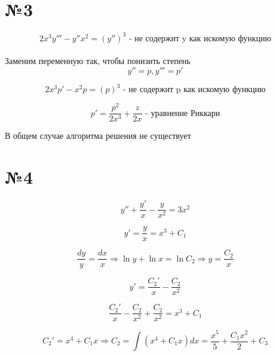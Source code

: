 \documentclass{article}
\begin{document}
\section*{№3}

\begin{equation*}
    2x^3y''' - y''x^2 = (y'')^3 \text{ - не содержит y как искомую функцию}
\end{equation*}
\\Заменим переменную так, чтобы понизить степень\\
\begin{equation*}
    y'' = p, y''' = p'
\end{equation*}

\begin{equation*}
    2x^3p' - x^2p = (p)^3 \text{ - не содержит p как искомую функцию}
\end{equation*}

\begin{equation*}
    p' = \frac{p^2}{2x^3} + \frac{z}{2x} \text{ - уравнение Риккари}
\end{equation*}

В общем случае алгоритма решения не существует

\section*{№4}

\begin{equation*}
    y'' + \frac{y'}{x} - \frac{y}{x^2} = 3x^2
\end{equation*}

\begin{equation*}
    y' = \frac{y}{x} = x^3 + C_1
\end{equation*}

\begin{equation*}
    \frac{dy}{y} = \frac{dx}{x} \Rightarrow \ln{y} + \ln{x} = \ln{C_2} \Rightarrow y = \frac{C_2}{x}
\end{equation*}

\begin{equation*}
    y' = \frac{C_2'}{x} - \frac{C_2}{x^2}
\end{equation*}

\begin{equation*}
    \frac{C_2'}{x} - \frac{C_2}{x^2} + \frac{C_2}{x^2} = x^3 + C_1
\end{equation*}

\begin{equation*}
    C_2' = x^4 + C_1x \Rightarrow  C_2 = \int{(x^4 + C_1x)dx} = \frac{x^5}{5} + \frac{C_1x^2}{2} + C_3
\end{equation*}
\end{document}
